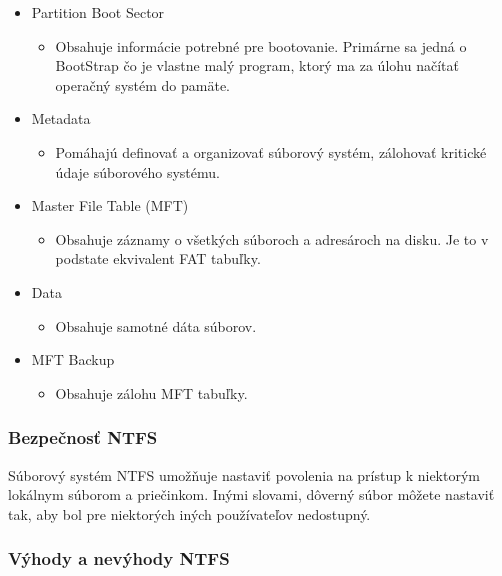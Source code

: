 \documentclass[12pt,oneside,slovak,a4paper]{article}
\begin{document}
\begin{spacing}{1.0}
\begin{itemize}
	\item Partition Boot Sector
		\begin{itemize}
			\item Obsahuje informácie potrebné pre bootovanie. Primárne sa jedná o BootStrap čo je vlastne malý program, ktorý ma za úlohu načítať operačný systém do pamäte.
		\end{itemize}
	\item Metadata
		\begin{itemize}
			\item Pomáhajú definovať a organizovať súborový systém, zálohovať kritické údaje súborového systému.
		\end{itemize}
	\item Master File Table (MFT)
		\begin{itemize}
			\item Obsahuje záznamy o všetkých súboroch a adresároch na disku. Je to v podstate ekvivalent FAT tabuľky.
		\end{itemize}
	\item Data
		\begin{itemize}
			\item Obsahuje samotné dáta súborov.
		\end{itemize}
	\item MFT Backup
		\begin{itemize}
			\item Obsahuje zálohu MFT tabuľky.
		\end{itemize}
\end{itemize}
\end{spacing}

\subsubsection{Bezpečnosť NTFS}
Súborový systém NTFS umožňuje nastaviť povolenia na prístup k niektorým lokálnym súborom a priečinkom. Inými slovami, dôverný súbor môžete nastaviť tak, aby bol pre niektorých iných používateľov nedostupný.



\subsubsection{Výhody a nevýhody NTFS}
\end{document}
